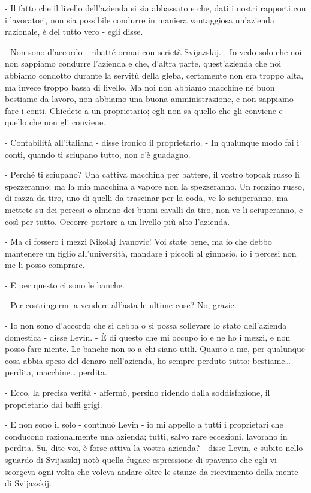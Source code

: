 - Il fatto che il livello dell'azienda si sia abbassato e che, dati i nostri rapporti con i lavoratori, non sia possibile condurre in maniera vantaggiosa un'azienda razionale, è del tutto vero - egli disse. 
\enlargethispage*{1\baselineskip}

- Non sono d'accordo - ribatté ormai con serietà Svijazskij. - Io vedo solo che noi non sappiamo condurre l'azienda e che, d'altra parte, quest'azienda che noi abbiamo condotto durante la servitù della gleba, certamente non era troppo alta, ma invece troppo bassa di livello. Ma noi non abbiamo macchine né buon bestiame da lavoro, non abbiamo una buona amministrazione, e non sappiamo fare i conti. Chiedete a un proprietario; egli non sa quello che gli conviene e quello che non gli conviene. 

- Contabilità all'italiana - disse ironico il proprietario. - In qualunque modo fai i conti, quando ti sciupano tutto, non c'è guadagno. 

- Perché ti sciupano? Una cattiva macchina per battere, il vostro topcak russo li spezzeranno; ma la mia macchina a vapore non la spezzeranno. Un ronzino russo, di razza da tiro, uno di quelli da trascinar per la coda, ve lo sciuperanno, ma mettete su dei percesi o almeno dei buoni cavalli da tiro, non ve li sciuperanno, e così per tutto. Occorre portare a un livello più alto l'azienda. 

- Ma ci fossero i mezzi Nikolaj Ivanovic! Voi state bene, ma io che debbo mantenere un figlio all'università, mandare i piccoli al ginnasio, io i percesi non me li posso comprare. 

- E per questo ci sono le banche. 

- Per costringermi a vendere all'asta le ultime cose? No, grazie. 

- Io non sono d'accordo che si debba o si possa sollevare lo stato dell'azienda domestica - disse Levin. - È di questo che mi occupo io e ne ho i mezzi, e non posso fare niente. Le banche non so a chi siano utili. Quanto a me, per qualunque cosa abbia speso del denaro nell'azienda, ho sempre perduto tutto: bestiame\ldots{} perdita, macchine\ldots{} perdita. 

- Ecco, la precisa verità - affermò, persino ridendo dalla soddisfazione, il proprietario dai baffi grigi. 

- E non sono il solo - continuò Levin - io mi appello a tutti i proprietari che conducono razionalmente una azienda; tutti, salvo rare eccezioni, lavorano in perdita. Su, dite voi, è forse attiva la vostra azienda? - disse Levin, e subito nello sguardo di Svijazskij notò quella fugace espressione di spavento che egli vi scorgeva ogni volta che voleva andare oltre le stanze da ricevimento della mente di Svijazskij. 

